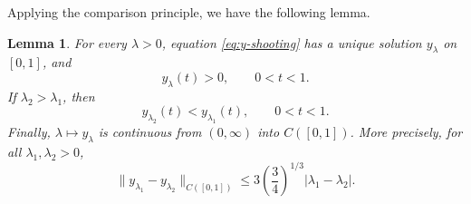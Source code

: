 \documentclass[a4paper,fleqn]{cas-sc}
\numberwithin{equation}{section}
\theoremstyle{plain}
\newtheorem{lemma}[theorem]{Lemma}
\theoremstyle{definition}
\begin{document}
Applying the comparison principle, we have the following lemma.

\begin{lemma}
\label{lem:shooting-properties}
For every \(\lambda>0\), equation \eqref{eq:y-shooting} has a unique solution
\(y_\lambda\) on \([0,1]\), and
\begin{equation}
    \label{eq:y>0}
y_\lambda(t)>0,\qquad 0<t<1.
\end{equation}
  If
\(\lambda_2>\lambda_1\), then
\begin{equation}
 y_{\lambda_2}(t)<y_{\lambda_1}(t),
 \qquad 0<t<1.
 \label{eq:shooting-strict-order}
\end{equation}
Finally, \(\lambda\mapsto y_\lambda\) is continuous from \((0,\infty)\) into \(C([0,1])\).
More precisely, for all \(\lambda_1,\lambda_2>0\),
\[
 \|y_{\lambda_1}-y_{\lambda_2}\|_{C([0,1])}
 \le 3\left(\frac34\right)^{1/3}|\lambda_1-\lambda_2|.
\]
\end{lemma}
\end{document}
